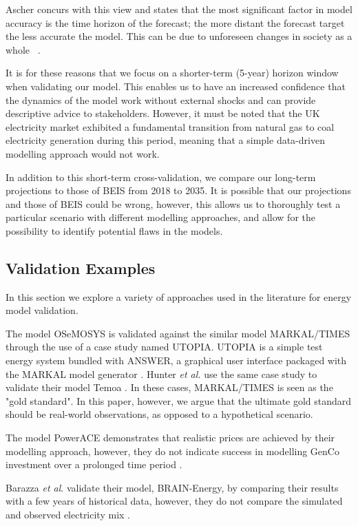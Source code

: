 Ascher concurs with this view and states that the most significant factor in model accuracy is the time horizon of the forecast; the more distant the forecast target the less accurate the model. This can be due to unforeseen changes in society as a whole ~\cite{gillespie_1979}.

It is for these reasons that we focus on a shorter-term (5-year) horizon window when validating our model. This enables us to have an increased confidence that the dynamics of the model work without external shocks and can provide descriptive advice to stakeholders. However, it must be noted that the UK electricity market exhibited a fundamental transition from natural gas to coal electricity generation during this period, meaning that a simple data-driven modelling approach would not work.

In addition to this short-term cross-validation, we compare our long-term projections to those of BEIS from 2018 to 2035. It is possible that our projections and those of BEIS could be wrong, however, this allows us to thoroughly test a particular scenario with different modelling approaches, and allow for the possibility to identify potential flaws in the models.


\subsection{Validation Examples}

In this section we explore a variety of approaches used in the literature for energy model validation.

The model OSeMOSYS \cite{Howells2011} is validated against the similar model MARKAL\slash TIMES through the use of a case study named UTOPIA. UTOPIA is a simple test energy system bundled with ANSWER, a graphical user interface packaged with the MARKAL model generator \cite{Hunter2013, Noble2004}. Hunter \textit{et al.} use the same case study to validate their model Temoa \cite{Hunter2013}. In these cases, MARKAL\slash TIMES is seen as the "gold standard". In this paper, however, we argue that the ultimate gold standard should be real-world observations, as opposed to a hypothetical scenario.

The model PowerACE demonstrates that realistic prices are achieved by their modelling approach, however, they do not indicate success in modelling GenCo investment over a prolonged time period \cite{Ringler2012}.

Barazza \textit{et al}. validate their model, BRAIN-Energy, by comparing their results with a few years of historical data, however, they do not compare the simulated and observed electricity mix \cite{Barazza2020}.

